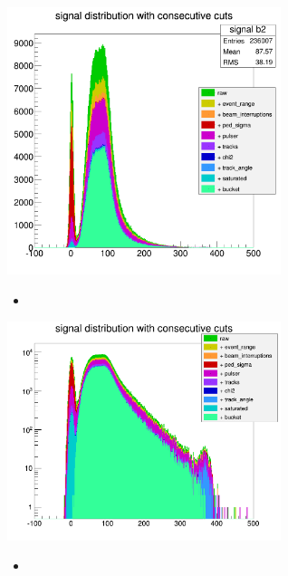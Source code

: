 \documentclass[9pt]{beamer}
\begin{document}
\begin{frame}
	\begin{center}
		\includegraphics[width=8cm]{Pics/consecutive}
	\end{center}
	\begin{itemize}
		\item 
	\end{itemize}
\end{frame}
\begin{frame}
	\begin{center}
		\includegraphics[width=8cm]{Pics/ConsLog}
	\end{center}
	\begin{itemize}
		\item 
	\end{itemize}
\end{frame}
\end{document}
